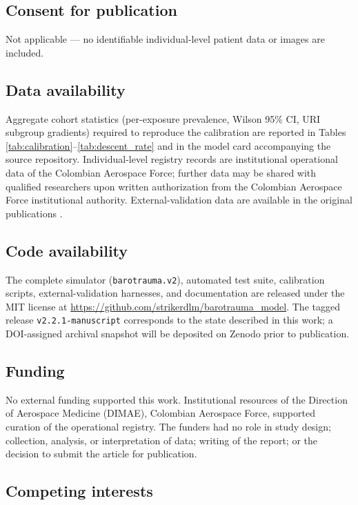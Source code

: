 \documentclass[11pt,a4paper]{article}
\begin{document}
\subsection{Consent for publication}

Not applicable --- no identifiable individual-level patient data or images are included.

\subsection{Data availability}

Aggregate cohort statistics (per-exposure prevalence, Wilson 95\% CI, URI subgroup gradients) required to reproduce the calibration are reported in Tables \ref{tab:calibration}--\ref{tab:descent_rate} and in the model card accompanying the source repository. Individual-level registry records are institutional operational data of the Colombian Aerospace Force; further data may be shared with qualified researchers upon written authorization from the Colombian Aerospace Force institutional authority. External-validation data are available in the original publications \citep{Morgagni2012,Landolfi2009,Morgagni2010}.

\subsection{Code availability}

The complete simulator (\texttt{barotrauma.v2}), automated test suite, calibration scripts, external-validation harnesses, and documentation are released under the MIT license at \url{https://github.com/strikerdlm/barotrauma_model}. The tagged release \texttt{v2.2.1-manuscript} corresponds to the state described in this work; a DOI-assigned archival snapshot will be deposited on Zenodo prior to publication.

\subsection{Funding}

No external funding supported this work. Institutional resources of the Direction of Aerospace Medicine (DIMAE), Colombian Aerospace Force, supported curation of the operational registry. The funders had no role in study design; collection, analysis, or interpretation of data; writing of the report; or the decision to submit the article for publication.

\subsection{Competing interests}
\end{document}
